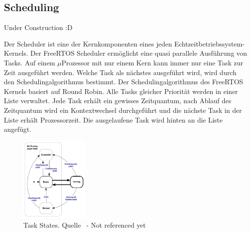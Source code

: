 \subsection{Scheduling}
\label{Scheduling}
Under Construction :D

Der Scheduler ist eine der Kernkomponenten eines jeden Echtzeitbetriebssystem-Kernels. Der FreeRTOS Scheduler ermöglicht eine quasi parallele Ausführung von Tasks. Auf einem $\mu$\-Prozessor mit nur einem Kern kann immer nur eine Task zur Zeit ausgeführt werden.  Welche Task als nächstes ausgeführt wird, wird durch den Schedulingalgorithmus bestimmt. Der Schedulingalgorithmus des FreeRTOS Kernels basiert auf Round Robin\cite{9783827373427}. Alle Tasks gleicher Priorität werden in einer Liste verwaltet. Jede Task erhält ein gewisses Zeitquantum, nach Ablauf des Zeitquantum wird ein Kontextwechsel durchgeführt und die nächste Task in der Liste erhält Prozessorzeit. Die ausgelaufene Task wird hinten an die Liste angefügt.

\begin{figure}[ht!]
	\centering
		\includegraphics[width=0.3\textwidth]{Pictures/FreeRTOSOrg/taskStates.png}
	\caption{Task States. Quelle~\protect{} - Not referenced yet}
	\label{fig:TaskStates}
\end{figure}

